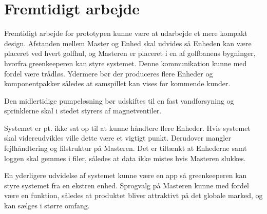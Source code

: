 \chapter{Fremtidigt arbejde}

Fremtidigt arbejde for prototypen kunne være at udarbejde et mere kompakt design. Afstanden mellem Master og Enhed skal udvides så Enheden kan være placeret ved hvert golfhul, og Masteren er placeret i en af golfbanens bygninger, hvorfra greenkeeperen kan styre systemet. Denne kommunikation kunne med fordel være trådløs. Ydermere bør der produceres flere Enheder og komponentpakker således at samspillet kan vises for kommende kunder. 

Den midlertidige pumpeløsning bør udskiftes til en fast vandforsyning og sprinklerne skal i stedet styrers af magnetventiler. 

Systemet er pt. ikke sat op til at kunne håndtere flere Enheder. Hvis systemet skal videreudvikles ville dette være et vigtigt punkt. Derudover mangler fejlhåndtering og filstruktur på Masteren. Det er tiltænkt at Enhederne samt loggen skal gemmes i filer, således at data ikke mistes hvis Masteren slukkes.

En yderligere udvidelse af systemet kunne være en app så greenkeeperen kan styre systemet fra en ekstren enhed. Sprogvalg på Masteren kunne med fordel være en funktion, således at produktet bliver attraktivt på det globale marked, og kan sælges i større omfang.